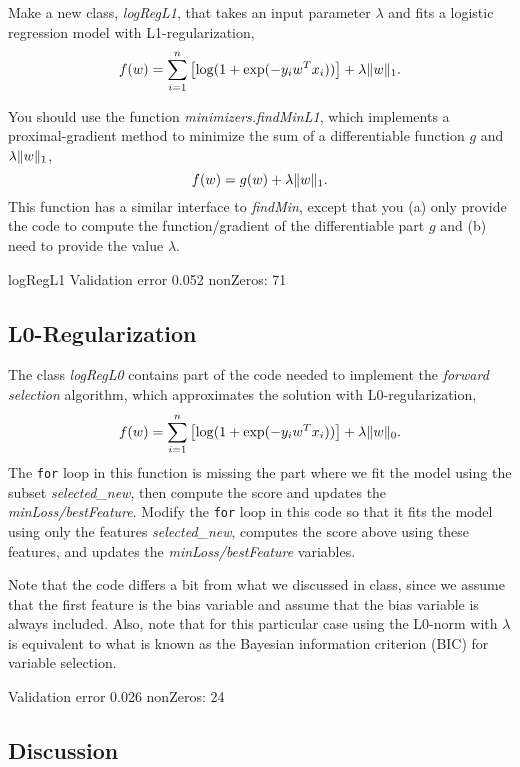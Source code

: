 \documentclass{article}
\begin{document}
Make a new class, \emph{logRegL1}, that takes an input parameter $\lambda$ and fits a logistic regression model with L1-regularization,
\[
f(w) = \sum_{i=1}^n \left[\log(1+\exp(-y_iw^Tx_i))\right] + \lambda\|w\|_1.
\]


You should use the function \emph{minimizers.findMinL1}, which implements a 
proximal-gradient method to minimize the sum of a differentiable function $g$ and $\lambda\|w\|_1$,
\[
f(w) = g(w) + \lambda \|w\|_1.
\]
This function has a similar interface to \emph{findMin}, except that you (a) 
only provide the code to compute the function/gradient of the differentiable 
part $g$ and (b) need to provide the value $\lambda$. 

logRegL1 Validation error 0.052 nonZeros: 71

\subsection{L0-Regularization}

The class \emph{logRegL0} contains part of the code needed to implement the \emph{forward selection} algorithm, 
which approximates the solution with L0-regularization,
\[
f(w) =  \sum_{i=1}^n \left[\log(1+\exp(-y_iw^Tx_i))\right] + \lambda\|w\|_0.
\]
The \texttt{for} loop in this function is missing the part where we fit the model using the subset \emph{selected\_new}, 
then compute the score and updates the \emph{minLoss/bestFeature}. 
Modify the \texttt{for} loop in this code so that it fits the model using only 
the features \emph{selected\_new}, computes the score above using these features, 
and updates the \emph{minLoss/bestFeature} variables.

Note that the code differs a bit from what we discussed in class, 
since we assume that the first feature is the bias variable and assume that the 
bias variable is always included. Also, note that for this particular case using 
the L0-norm with $\lambda$ is equivalent to what is known as the Bayesian 
information criterion (BIC) for variable selection.

Validation error 0.026 nonZeros: 24

\subsection{Discussion}
\end{document}
